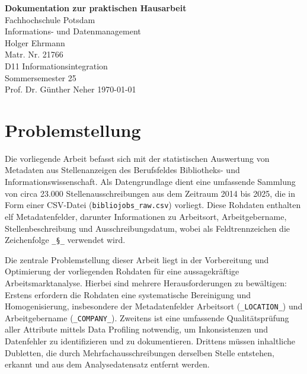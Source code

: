 \documentclass[
    a4paper,
    12pt,
    headinclude=true,
    BCOR=10mm,
]{scrreprt}
\begin{document}
\begin{titlepage}
    \centering
    \vspace*{1cm}
    \Large{\textbf{Dokumentation zur praktischen Hausarbeit}}\\
    \vspace{1.5cm}
    \Large{Fachhochschule Potsdam}\\
    \vspace{0.5cm}
    \large{Informations- und Datenmanagement}\\
    \vspace{1.5cm}
    Holger Ehrmann\\
    Matr. Nr. 21766\\
    \vspace{1cm}
    D11 Informationsintegration\\
    Sommersemester 25\\
    Prof. Dr. Günther Neher
    \vfill
    \today
\end{titlepage}
\setcounter{tocdepth}{1}
\begingroup
{} %
{\small \tableofcontents}
\endgroup

\printglossary[type=\acronymtype,title=Abkürzungsverzeichnis,toctitle=Abkürzungsverzeichnis,style=index]

\chapter{Problemstellung}

Die vorliegende Arbeit befasst sich mit der statistischen Auswertung von Metadaten aus Stellenanzeigen des Berufsfeldes Bibliotheks- und Informationswissenschaft. Als Datengrundlage dient eine umfassende Sammlung von circa 23.000 Stellenausschreibungen aus dem Zeitraum 2014 bis 2025, die in Form einer CSV-Datei (\texttt{bibliojobs\_raw.csv}) vorliegt. Diese Rohdaten enthalten elf Metadatenfelder, darunter Informationen zu Arbeitsort, Arbeitgebername, Stellenbeschreibung und Ausschreibungsdatum, wobei als Feldtrennzeichen die Zeichenfolge \texttt{\_§\_} verwendet wird.

Die zentrale Problemstellung dieser Arbeit liegt in der Vorbereitung und Optimierung der vorliegenden Rohdaten für eine aussagekräftige Arbeitsmarktanalyse. Hierbei sind mehrere Herausforderungen zu bewältigen: Erstens erfordern die Rohdaten eine systematische Bereinigung und Homogenisierung, insbesondere der Metadatenfelder Arbeitsort (\texttt{\_LOCATION\_}) und Arbeitgebername (\texttt{\_COMPANY\_}). Zweitens ist eine umfassende Qualitätsprüfung aller Attribute mittels Data Profiling notwendig, um Inkonsistenzen und Datenfehler zu identifizieren und zu dokumentieren. Drittens müssen inhaltliche Dubletten, die durch Mehrfachausschreibungen derselben Stelle entstehen, erkannt und aus dem Analysedatensatz entfernt werden.
\end{document}
